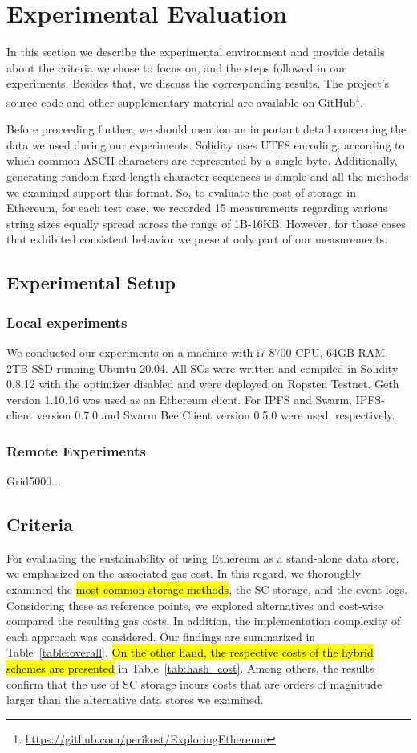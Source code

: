 \chapter{Experimental Evaluation}\label{chapter:experiments}
In this section we describe the experimental environment and provide details about the criteria we chose to focus on, and the steps followed in our experiments. Besides that, we discuss the corresponding results. The project's source code and other supplementary material are available on GitHub\footnote{\url{https://github.com/perikost/ExploringEthereum}}.

Before proceeding further, we should mention an important detail concerning the data we used during our experiments. Solidity uses UTF8 encoding, according to which common ASCII characters are represented by a single byte. Additionally, generating random fixed-length character sequences is simple and all the methods we examined support this format. So, to evaluate the cost of storage in Ethereum, for each test case, we recorded 15 measurements regarding various string sizes equally spread across the range of 1B-16KB. However, for those cases that exhibited consistent behavior we present only part of our measurements.

\section{Experimental Setup}\label{sec:}
\subsection{Local experiments}\label{sec:}
We conducted our experiments on a machine with i7-8700 CPU, 64GB RAM, 2TB SSD running Ubuntu 20.04. All SCs were written and compiled in Solidity 0.8.12 with the optimizer disabled and were deployed on Ropsten Testnet. Geth version 1.10.16 was used as an Ethereum client. For IPFS and Swarm, IPFS-client version 0.7.0 and Swarm Bee Client version 0.5.0 were used, respectively.
\subsection{Remote Experiments}\label{sec:}
Grid5000...
\section{Criteria}\label{sec:}
For evaluating the sustainability of using Ethereum as a stand-alone data store, we emphasized on the associated gas cost. In this regard, we thoroughly examined the \hl{most common storage methods}, the SC storage, and the event-logs. Considering these as reference points, we explored alternatives and cost-wise compared the resulting gas costs. In addition, the implementation complexity of each approach was considered. Our findings are summarized in Table~\ref{table:overall}. \hl{On the other hand, the respective costs of the hybrid schemes are presented} in Table~\ref{tab:hash_cost}. Among others, the results confirm that the use of SC storage incurs costs that are orders of magnitude larger than the alternative data stores we examined.

